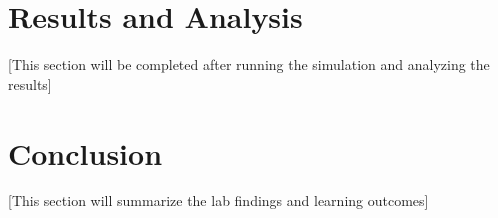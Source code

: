 \documentclass[12pt]{article}
\begin{document}
\section{Results and Analysis}
[This section will be completed after running the simulation and analyzing the results]

\section{Conclusion}
[This section will summarize the lab findings and learning outcomes]
\end{document}
